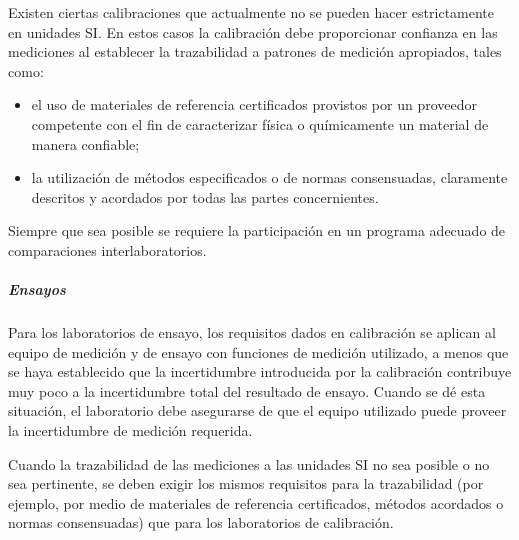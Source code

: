 				\par \noindent
					Existen ciertas calibraciones que actualmente no se pueden hacer estrictamente en unidades SI.
					En estos casos la calibración debe proporcionar confianza en las mediciones al establecer la trazabilidad a
					patrones de medición apropiados, tales como:
					
\newpage
\thispagestyle{plain}

				\begin{itemize}
					\item el uso de materiales de referencia certificados provistos por un proveedor competente con el fin de
					caracterizar física o químicamente un material de manera confiable;
					
					\item la utilización de métodos especificados o de normas consensuadas, claramente descritos y acordados
					por todas las partes concernientes.
				\end{itemize}
			
				\par \noindent
					Siempre que sea posible se requiere la participación en un programa adecuado de comparaciones
					interlaboratorios.
					
			\subparagraph{Ensayos}
				\par 
					Para los laboratorios de ensayo, los requisitos dados en calibración se aplican al equipo de medición
					y de ensayo con funciones de medición utilizado, a menos que se haya establecido que la incertidumbre
					introducida por la calibración contribuye muy poco a la incertidumbre total del resultado de ensayo. Cuando
					se dé esta situación, el laboratorio debe asegurarse de que el equipo utilizado puede proveer la incertidumbre
					de medición requerida.
					
				\par \noindent
					Cuando la trazabilidad de las mediciones a las unidades SI no sea posible o no sea pertinente,
					se deben exigir los mismos requisitos para la trazabilidad (por ejemplo, por medio de materiales de referencia
					certificados, métodos acordados o normas consensuadas) que para los laboratorios de calibración.
					
